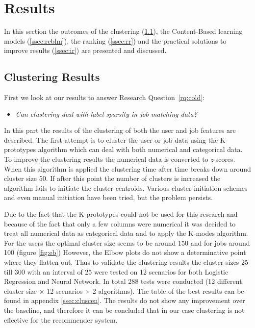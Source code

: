 \section{Results}
\label{sec:rslts}

In this section the outcomes of the clustering (\ref{ssec:clures}), the Content-Based learning models (\ref{ssec:rcblm}), the ranking (\ref{ssec:rr}) and the practical solutions to improve results (\ref{ssec:ir}) are presented and discussed.

\subsection{Clustering Results}
\label{ssec:clures}

First we look at our results to answer Research Question~\ref{rq:cold}:
\begin{itemize}
	\item[] \em Can clustering deal with label sparsity in job matching data?
\end{itemize}

\noindent In this part the results of the clustering of both the user and job features are described.
The first attempt is to cluster the user or job data using the K-prototypes algorithm which can deal with both numerical and categorical data.
To improve the clustering results the numerical data is converted to \textit{z}-scores.
When this algorithm is applied the clustering time after time breaks down around cluster size 50. If after this point the number of clusters is increased the algorithm fails to initiate the cluster centroids.
Various cluster initiation schemes and even manual initiation have been tried, but the problem persists.

Due to the fact that the K-prototypes could not be used for this research and because of the fact that only a few columns were numerical it was decided to treat all numerical data as categorical data and to apply the K-modes algorithm.
For the users the optimal cluster size seems to be around 150 and for jobs around 100 (figure \ref{fig:eb})
However, the Elbow plots do not show a determinative point where they flatten out.
Thus to validate the clustering results the cluster sizes 25 till 300 with an interval of 25 were tested on 12 scenarios for both Logistic Regression and Neural Network.
In total 288 tests were conducted (12 different cluster size $\times$ 12 scenarios $\times$ 2 algorithms). 
The table of the best results can be found in appendix \ref{ssec:cluscen}.
The results do not show any improvement over the baseline, and therefore it can be concluded that in our case clustering is not effective for the recommender system.

